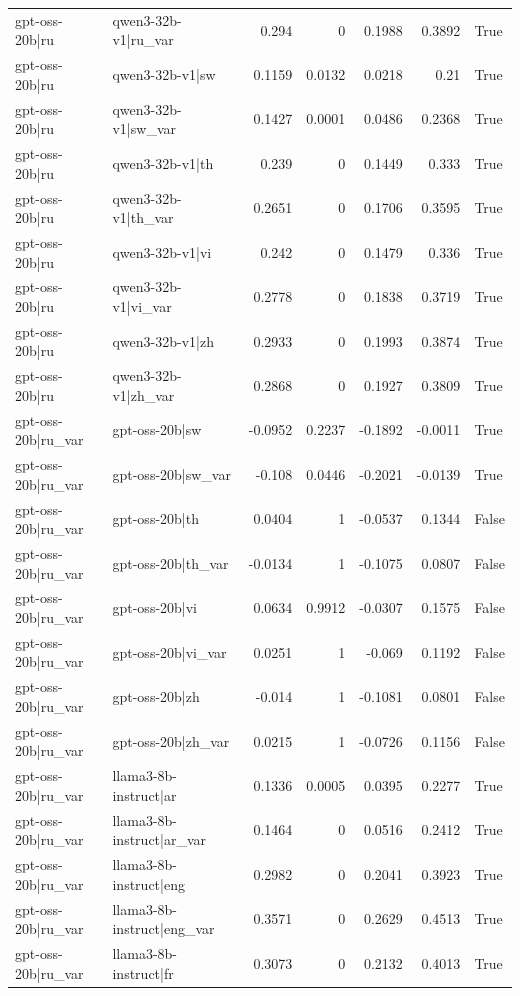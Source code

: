 \begin{table}
\begin{tabular}{l l r r r r l}
gpt-oss-20b|ru & qwen3-32b-v1|ru_var & 0.294 & 0 & 0.1988 & 0.3892 & True \\
gpt-oss-20b|ru & qwen3-32b-v1|sw & 0.1159 & 0.0132 & 0.0218 & 0.21 & True \\
gpt-oss-20b|ru & qwen3-32b-v1|sw_var & 0.1427 & 0.0001 & 0.0486 & 0.2368 & True \\
gpt-oss-20b|ru & qwen3-32b-v1|th & 0.239 & 0 & 0.1449 & 0.333 & True \\
gpt-oss-20b|ru & qwen3-32b-v1|th_var & 0.2651 & 0 & 0.1706 & 0.3595 & True \\
gpt-oss-20b|ru & qwen3-32b-v1|vi & 0.242 & 0 & 0.1479 & 0.336 & True \\
gpt-oss-20b|ru & qwen3-32b-v1|vi_var & 0.2778 & 0 & 0.1838 & 0.3719 & True \\
gpt-oss-20b|ru & qwen3-32b-v1|zh & 0.2933 & 0 & 0.1993 & 0.3874 & True \\
gpt-oss-20b|ru & qwen3-32b-v1|zh_var & 0.2868 & 0 & 0.1927 & 0.3809 & True \\
gpt-oss-20b|ru_var & gpt-oss-20b|sw & -0.0952 & 0.2237 & -0.1892 & -0.0011 & True \\
gpt-oss-20b|ru_var & gpt-oss-20b|sw_var & -0.108 & 0.0446 & -0.2021 & -0.0139 & True \\
gpt-oss-20b|ru_var & gpt-oss-20b|th & 0.0404 & 1 & -0.0537 & 0.1344 & False \\
gpt-oss-20b|ru_var & gpt-oss-20b|th_var & -0.0134 & 1 & -0.1075 & 0.0807 & False \\
gpt-oss-20b|ru_var & gpt-oss-20b|vi & 0.0634 & 0.9912 & -0.0307 & 0.1575 & False \\
gpt-oss-20b|ru_var & gpt-oss-20b|vi_var & 0.0251 & 1 & -0.069 & 0.1192 & False \\
gpt-oss-20b|ru_var & gpt-oss-20b|zh & -0.014 & 1 & -0.1081 & 0.0801 & False \\
gpt-oss-20b|ru_var & gpt-oss-20b|zh_var & 0.0215 & 1 & -0.0726 & 0.1156 & False \\
gpt-oss-20b|ru_var & llama3-8b-instruct|ar & 0.1336 & 0.0005 & 0.0395 & 0.2277 & True \\
gpt-oss-20b|ru_var & llama3-8b-instruct|ar_var & 0.1464 & 0 & 0.0516 & 0.2412 & True \\
gpt-oss-20b|ru_var & llama3-8b-instruct|eng & 0.2982 & 0 & 0.2041 & 0.3923 & True \\
gpt-oss-20b|ru_var & llama3-8b-instruct|eng_var & 0.3571 & 0 & 0.2629 & 0.4513 & True \\
gpt-oss-20b|ru_var & llama3-8b-instruct|fr & 0.3073 & 0 & 0.2132 & 0.4013 & True \\

\end{tabular}
\end{table}
